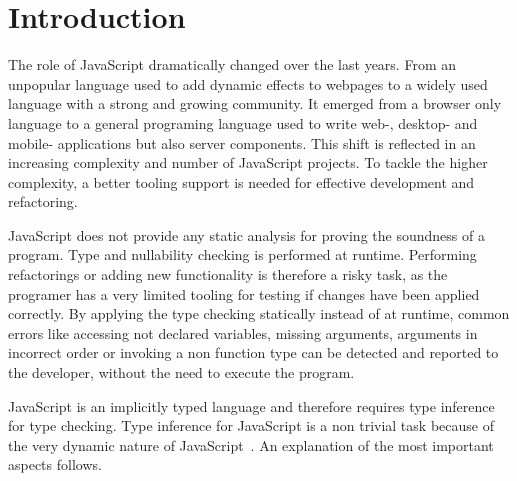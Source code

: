 \section{Introduction}
The role of JavaScript dramatically changed over the last years. From an unpopular language used to add dynamic effects to webpages to a widely used language with a strong and growing community. It emerged from a browser only language to a general programing language used to write web-,  desktop- and mobile- applications but also server components. This shift is reflected in an increasing complexity and number of JavaScript projects. To tackle the higher complexity, a better tooling support is needed for effective development and refactoring.  

JavaScript does not provide any static analysis for proving the soundness of a program. Type and nullability checking is performed at runtime. Performing refactorings or adding new functionality is therefore a risky task, as the programer has a very limited tooling for testing if changes have been applied correctly. By applying the type checking statically instead of at runtime, common errors like accessing not declared variables, missing arguments, arguments in incorrect order or invoking a non function type can be detected and reported to the developer, without the need to execute the program. 

JavaScript is an implicitly typed language and therefore requires type inference for type checking. Type inference for JavaScript is a non trivial task because of the very dynamic nature of JavaScript~\cite{JensenMollerThiemann2009}. An explanation of the most important aspects follows.

